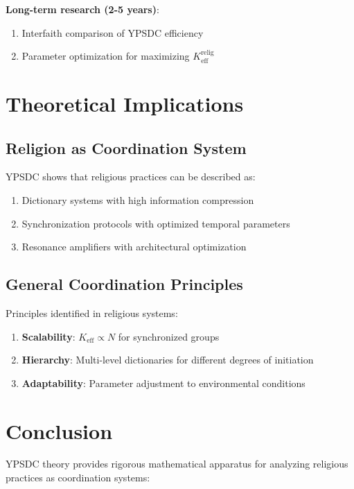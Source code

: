 \documentclass[12pt,a4paper]{article}
\begin{document}
	\textbf{Long-term research (2-5 years)}:
	\begin{enumerate}
		\item Interfaith comparison of YPSDC efficiency
		\item Parameter optimization for maximizing $K_{\mathrm{eff}}^{\mathrm{relig}}$
	\end{enumerate}
	
	\section{Theoretical Implications}
	
	\subsection{Religion as Coordination System}
	
	YPSDC shows that religious practices can be described as:
	\begin{enumerate}
		\item Dictionary systems with high information compression
		\item Synchronization protocols with optimized temporal parameters
		\item Resonance amplifiers with architectural optimization
	\end{enumerate}
	
	\subsection{General Coordination Principles}
	
	Principles identified in religious systems:
	\begin{enumerate}
		\item \textbf{Scalability}: $K_{\mathrm{eff}} \propto N$ for synchronized groups
		\item \textbf{Hierarchy}: Multi-level dictionaries for different degrees of initiation
		\item \textbf{Adaptability}: Parameter adjustment to environmental conditions
	\end{enumerate}
	
	\section{Conclusion}
	
	YPSDC theory provides rigorous mathematical apparatus for analyzing religious practices as coordination systems:
	
\end{document}
